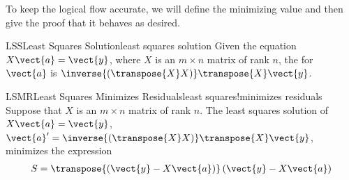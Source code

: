 %
To keep the logical flow accurate, we will define the minimizing value and then give the proof that it behaves as desired.
%
\begin{definition}{LSS}{Least Squares Solution}{least squares solution}
Given the equation $X\vect{a}=\vect{y}$, where $X$ is an $m\times n$ matrix of rank $n$, the  for $\vect{a}$ is $\inverse{\left(\transpose{X}X\right)}\transpose{X}\vect{y}$.
\end{definition}
%
%
\begin{theorem}{LSMR}{Least Squares Minimizes Residuals}{least squares!minimizes residuals}
Suppose that $X$ is an $m\times n$ matrix of rank $n$.  The least squares solution of $X\vect{a}=\vect{y}$, $\vect{a}^\prime=\inverse{\left(\transpose{X}X\right)}\transpose{X}\vect{y}$, minimizes the expression 
%
\begin{align*}
S=\transpose{\left(\vect{y}-X\vect{a}\right)}\left(\vect{y}-X\vect{a}\right)
\end{align*}
%
\end{theorem}
%
